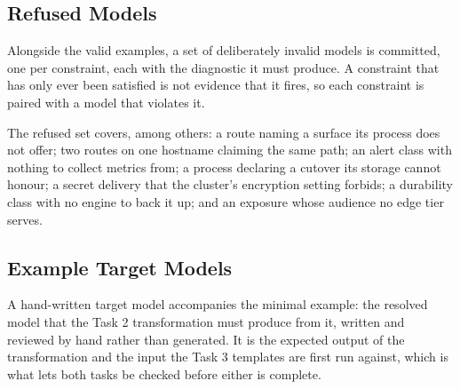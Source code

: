 \subsection{Refused Models}

Alongside the valid examples, a set of deliberately invalid models is
committed, one per constraint, each with the diagnostic it must produce. A
constraint that has only ever been satisfied is not evidence that it fires, so
each constraint is paired with a model that violates it.

The refused set covers, among others: a route naming a surface its process does
not offer; two routes on one hostname claiming the same path; an alert class
with nothing to collect metrics from; a process declaring a cutover its storage
cannot honour; a secret delivery that the cluster's encryption setting forbids;
a durability class with no engine to back it up; and an exposure whose audience
no edge tier serves.

\subsection{Example Target Models}

A hand-written target model accompanies the minimal example: the resolved model
that the Task 2 transformation must produce from it, written and reviewed by
hand rather than generated. It is the expected output of the transformation and
the input the Task 3 templates are first run against, which is what lets both
tasks be checked before either is complete.
